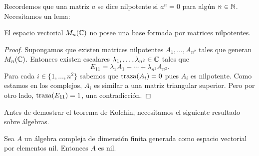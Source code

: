 Recordemos que una matriz $a$ se dice nilpotente si $a^n=0$ para algún $n\in\mathbb{N}$. 
Necesitamos un lema:

\begin{lemma}
	\label{lem:base_de_nilpotentes}
	El espacio vectorial $M_n(\mathbb{C})$ no posee una base formada por matrices
	nilpotentes.
\end{lemma}

\begin{proof}
	Supongamos que existen matrices nilpotentes $A_1,\dots,A_{n^2}$ tales que
	generan $M_n(\mathbb{C})$. Entonces existen escalares
	$\lambda_1,\dots,\lambda_{n^2}\in \mathbb{C}$ tales que
	\[
		E_{11}=\lambda_1A_1+\cdots+\lambda_{n^2}A_{n^2}.
	\]
	Para cada $i\in\{1,\dots,n^2\}$ sabemos que $\operatorname{traza}(A_i)=0$ pues $A_i$ es
	nilpotente. Como estamos en los complejos, $A_i$ es similar a una
	matriz triangular superior. Pero por otro lado, $\operatorname{traza}(E_{11})=1$, una
	contradicción.
\end{proof}

Antes de demostrar el teorema de Kolchin, 
necesitamos el siguiente resultado sobre álgebras.  

\begin{theorem}[Wedderburn]
	Sea $A$ un álgebra compleja de dimensión finita generada como espacio vectorial por
	elementos nil. Entonces $A$ es nil.
\end{theorem}

